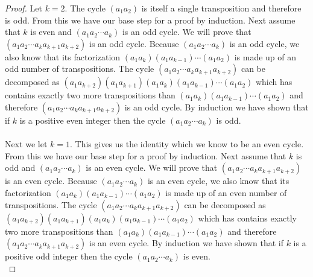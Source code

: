 \documentclass[11pt,a4paper]{article}
\begin{document}
\begin{proof}
Let $k=2$. The cycle $(a_1 a_2)$ is itself a single transposition and therefore is odd. From this we have our base step for a proof by induction. Next assume that $k$ is even and $(a_1 a_2 \cdots a_k)$ is an odd cycle. We will prove that $(a_1 a_2 \cdots a_k a_{k+1} a_{k+2})$ is an odd cycle. Because $(a_1 a_2 \cdots a_k)$ is an odd cycle, we also know that its factorization $(a_1a_k)(a_1a_{k-1})\cdots(a_1a_2)$ is made up of an odd number of transpositions. The cycle $(a_1 a_2 \cdots a_k a_{k+1} a_{k+2})$ can be decomposed as $(a_1a_{k+2})(a_1a_{k+1})(a_1a_k)(a_1a_{k-1})\cdots(a_1a_2)$ which has contains exactly two more transpositions than $(a_1a_k)(a_1a_{k-1})\cdots(a_1a_2)$ and therefore $(a_1 a_2 \cdots a_k a_{k+1} a_{k+2})$ is an odd cycle. By induction we have shown that if $k$ is a positive even integer then the cycle $(a_1 a_2 \cdots a_k)$ is odd.\\
~\\
Next we let $k=1$. This gives us the identity which we know to be an even cycle. From this we have our base step for a proof by induction. Next assume that $k$ is odd and $(a_1 a_2 \cdots a_k)$ is an even cycle. We will prove that $(a_1 a_2 \cdots a_k a_{k+1} a_{k+2})$ is an even cycle. Because $(a_1 a_2 \cdots a_k)$ is an even cycle, we also know that its factorization $(a_1a_k)(a_1a_{k-1})\cdots(a_1a_2)$ is made up of an even number of transpositions. The cycle $(a_1 a_2 \cdots a_k a_{k+1} a_{k+2})$ can be decomposed as $(a_1a_{k+2})(a_1a_{k+1})(a_1a_k)(a_1a_{k-1})\cdots(a_1a_2)$ which has contains exactly two more transpositions than $(a_1a_k)(a_1a_{k-1})\cdots(a_1a_2)$ and therefore $(a_1 a_2 \cdots a_k a_{k+1} a_{k+2})$ is an even cycle. By induction we have shown that if $k$ is a positive odd integer then the cycle $(a_1 a_2 \cdots a_k)$ is even.\\
\end{proof}
\end{document}
